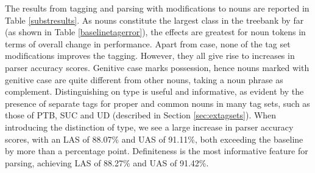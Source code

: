 \documentclass[11pt,a4paper]{article}
\begin{document}
The results from tagging and parsing with modifications to nouns are reported
in Table \ref{substresults}. As nouns constitute the largest class in the
treebank by far (as shown in Table \ref{baselinetagerror}), the effects are
greatest for noun tokens in terms of overall change in performance. Apart from
case, none of the tag set modifications improves the tagging. However, they all
give rise to increases in parser accuracy scores. Genitive case marks
possession, hence nouns marked with genitive case are quite different from
other nouns, taking a noun phrase as complement. Distinguishing on type is
useful and informative, as evident by the presence of separate tags for proper
and common nouns in many tag sets, such as those of PTB, SUC and UD (described
in Section \ref{sec:extagsets}). When introducing the distinction of type, we
see a large increase in parser accuracy scores, with an LAS of 88.07\% and UAS
of 91.11\%, both exceeding the baseline by more than a percentage point.
Definiteness is the most informative feature for parsing, achieving LAS of
88.27\% and UAS of 91.42\%.

\end{document}

